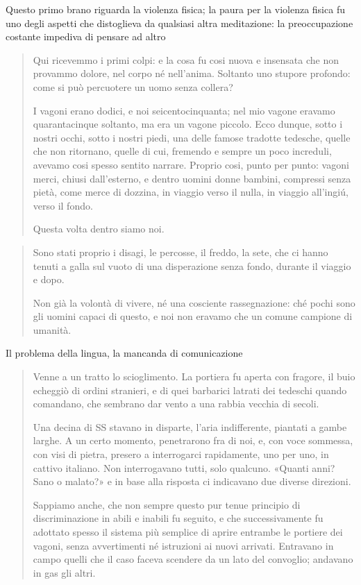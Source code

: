 \documentclass[a4paper, twoside, titlepage]{book}
\newcommand{\citazione}[1]{%
  \begin{quotation}
  \begin{linenumbers}
  \modulolinenumbers[5]
  \begingroup
  \setlength{\parindent}{0cm}
  \noindent #1
  \endgroup
  \end{linenumbers}
  \end{quotation}\setcounter{linenumber}{1}
  }
\begin{document}
Questo primo brano riguarda la violenza fisica; la paura per la violenza fisica fu uno degli aspetti che distoglieva da qualsiasi altra meditazione: la preoccupazione costante impediva di pensare ad altro

\citazione{ Qui ricevemmo i primi colpi: e la cosa fu cosi nuova e insensata che non provammo dolore, nel corpo né nell'anima. Soltanto uno stupore profondo: come si può percuotere un uomo senza collera?

I vagoni erano dodici, e noi seicentocinquanta; nel mio vagone eravamo quarantacinque soltanto, ma era un vagone piccolo. Ecco dunque, sotto i nostri occhi, sotto i nostri piedi, una delle famose tradotte tedesche, quelle che non ritornano, quelle di cui, fremendo e sempre un poco increduli, avevamo cosi spesso sentito narrare. Proprio cosi, punto per punto: vagoni merci, chiusi dall'esterno, e dentro uomini donne bambini, compressi senza pietà, come merce di dozzina, in viaggio verso il nulla, in viaggio all'ingiú, verso il fondo.

Questa volta dentro siamo noi.}

\citazione{ Sono stati proprio i disagi, le percosse, il freddo, la sete, che ci hanno tenuti a galla sul vuoto di una disperazione senza fondo, durante il viaggio e dopo.

Non già la volontà di vivere, né una cosciente rassegnazione: ché pochi sono gli uomini capaci di questo, e noi non eravamo che un comune campione di umanità.}

Il problema della lingua, la mancanda di comunicazione

\citazione{ Venne a un tratto lo scioglimento. La portiera fu aperta con fragore, il buio echeggiò di ordini stranieri, e di quei barbarici latrati dei tedeschi quando comandano, che sembrano dar vento a una rabbia vecchia di secoli.

Una decina di SS stavano in disparte, l'aria indifferente, piantati a gambe larghe. A un certo momento, penetrarono fra di noi, e, con voce sommessa, con visi di pietra, presero a interrogarci rapidamente, uno per uno, in cattivo italiano. Non interrogavano tutti, solo qualcuno. «Quanti anni? Sano o malato?» e in base alla risposta ci indicavano due diverse direzioni.

Sappiamo anche, che non sempre questo pur tenue principio di discriminazione in abili e inabili fu seguito, e che successivamente fu adottato spesso il sistema più semplice di aprire entrambe le portiere dei vagoni, senza avvertimenti né istruzioni ai nuovi arrivati. Entravano in campo quelli che il caso faceva scendere da un lato del convoglio; andavano in gas gli altri.}
\end{document}

